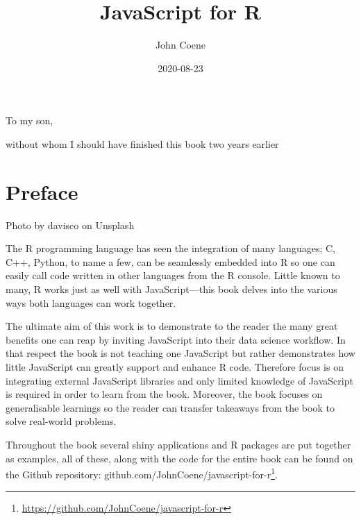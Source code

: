 \documentclass[
]{krantz}
\title{JavaScript for R}
\author{John Coene}
\date{2020-08-23}
\renewcommand{\href}[2]{#2\footnote{\url{#1}}}
\begin{document}
\maketitle


\thispagestyle{empty}

\begin{center}
To my son,

without whom I should have finished this book two years earlier
\end{center}

\setlength{\abovedisplayskip}{-5pt}
\setlength{\abovedisplayshortskip}{-5pt}

{
\hypersetup{linkcolor=}
\setcounter{tocdepth}{2}
\tableofcontents
}
\listoftables
\listoffigures
\hypertarget{preface}{%
\chapter*{Preface}\label{preface}}


{Photo by davisco on Unsplash}

The R programming language has seen the integration of many languages; C, C++, Python, to name a few, can be seamlessly embedded into R so one can easily call code written in other languages from the R console. Little known to many, R works just as well with JavaScript---this book delves into the various ways both languages can work together.

The ultimate aim of this work is to demonstrate to the reader the many great benefits one can reap by inviting JavaScript into their data science workflow. In that respect the book is not teaching one JavaScript but rather demonstrates how little JavaScript can greatly support and enhance R code. Therefore focus is on integrating external JavaScript libraries and only limited knowledge of JavaScript is required in order to learn from the book. Moreover, the book focuses on generalisable learnings so the reader can transfer takeaways from the book to solve real-world problems.

Throughout the book several shiny applications and R packages are put together as examples, all of these, along with the code for the entire book can be found on the Github repository: \href{https://github.com/JohnCoene/javascript-for-r}{github.com/JohnCoene/javascript-for-r}.
\end{document}
